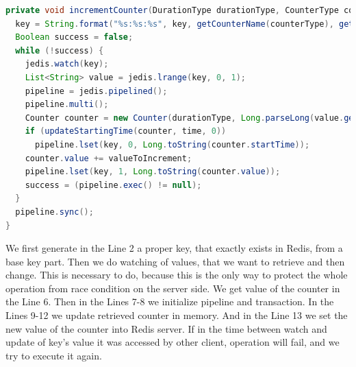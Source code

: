 \begin{lstlisting}[float=h, caption=Example of updating counter aggregation in the Redis database., label=listing:incrementCounter, language=Java]
private void incrementCounter(DurationType durationType, CounterType counterType, String key, long time, long valueToIncrement) {
  key = String.format("%s:%s:%s", key, getCounterName(counterType), getDurationName(durationType));
  Boolean success = false;
  while (!success) {
    jedis.watch(key);
    List<String> value = jedis.lrange(key, 0, 1);
    pipeline = jedis.pipelined();
    pipeline.multi();
    Counter counter = new Counter(durationType, Long.parseLong(value.get(0)), Long.parseLong(value.get(1)));
    if (updateStartingTime(counter, time, 0))
      pipeline.lset(key, 0, Long.toString(counter.startTime));
    counter.value += valueToIncrement;
    pipeline.lset(key, 1, Long.toString(counter.value));
    success = (pipeline.exec() != null);
  }
  pipeline.sync();
}
\end{lstlisting}

We first generate in the Line 2 a proper key, that exactly exists in Redis, from a base key part.
Then we do watching of values, that we want to retrieve and then change.
This is necessary to do, because this is the only way to protect the whole operation from race condition on the server side.
We get value of the counter in the Line 6.
Then in the Lines 7-8 we initialize pipeline and transaction.
In the Lines 9-12 we update retrieved counter in memory.
And in the Line 13 we set the new value of the counter into Redis server.
If in the time between watch and update of key's value it was accessed by other client, operation will fail, and we try to execute it again.